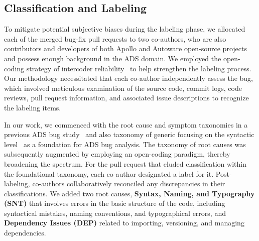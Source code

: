 \subsection{Classification and Labeling}

To mitigate potential subjective biases during the labeling phase, we allocated each of the \numbug merged bug-fix pull requests to two co-authors, who are also contributors and developers of both Apollo and Autoware open-source projects and possess enough background in the ADS domain. 
We employed the open-coding strategy of intercoder reliability~\cite{intercoder_reliability} to help strengthen the labeling process.
Our methodology necessitated that each co-author independently assess the bug, which involved meticulous examination of the source code, commit logs, code reviews, pull request information, and associated issue descriptions to recognize the labeling items.

In our work, we commenced with the root cause and symptom taxonomies in a previous ADS bug study~\cite{GarciaF0AXC20} and also taxonomy of generic \bfps focusing on the syntactic level~\cite{PanKW09,SotoTWGL16,CamposM17,IslamZ20}
as a foundation for ADS bug analysis. 
The taxonomy of root causes was subsequently augmented by employing an open-coding paradigm, thereby broadening the spectrum. 
For the pull request that eluded classification within the foundational taxonomy, each co-author designated a label for it. Post-labeling, co-authors collaboratively reconciled any discrepancies in their classifications. 
We added two root causes, \textbf{Syntax, Naming, and Typography (SNT)} that involves errors in the basic structure of the code, including syntactical mistakes, naming conventions, and typographical errors, and \textbf{Dependency Issues (DEP)} related to importing, versioning, and managing dependencies.

